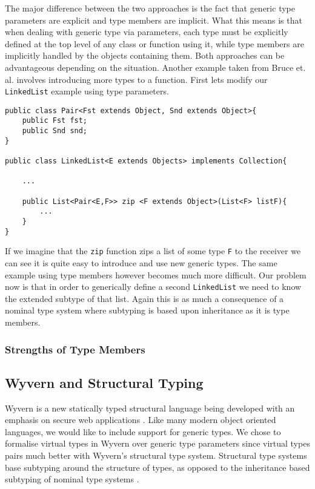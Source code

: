 \documentclass[11pt
              , a4paper
              , twoside
              , openright
              ]{report}
\numberwithin{case}{theorem}
\numberwithin{subcase}{case}
\begin{document}
The major difference between the two approaches is the fact that generic type parameters are explicit and type members are implicit. What this means is that when dealing with generic type via parameters, each type must be explicitly defined at the top level of any class or function using it, while type members are implicitly handled by the objects containing them. Both approaches can be advantageous depending on the situation. Another example taken from Bruce et. al. \cite{Bruce:1998:SSA:646155.679691} involves introducing more types to a function. First lets modify our \verb|LinkedList| example using type parameters.
\begin{lstlisting}[mathescape, style=custom_lang]
public class Pair<Fst extends Object, Snd extends Object>{
	public Fst fst;
	public Snd snd;
}

public class LinkedList<E extends Objects> implements Collection{

	...
	
	public List<Pair<E,F>> zip <F extends Object>(List<F> listF){
		...
	}	
}
\end{lstlisting}
If we imagine that the \verb|zip| function zips a list of some type \verb|F| to the receiver we can see it is quite easy to introduce and use new generic types. The same example using type members however becomes much more difficult. Our problem now is that in order to generically define a second \verb|LinkedList| we need to know the extended subtype of that list. Again this is as much a consequence of a nominal type system where subtyping is based upon inheritance as it is type members. 

\subsubsection{Strengths of Type Members}


\subsection{Wyvern and Structural Typing} \label{s:intro:wyvern}
Wyvern is a new statically typed structural language being developed with an emphasis on secure web applications \cite{Nistor:2013:WST:2489828.2489830, Omar2014}. Like many modern object oriented languages, we would like to include support for generic types. We chose to formalise virtual types in Wyvern over generic type parameters since virtual types pairs much better with Wyvern's structural type system. Structural type systems base subtyping around the structure of types, as opposed to the inheritance based subtyping of nominal type systems \cite{Cook:1989:IS:96709.96721}. 
\end{document}

